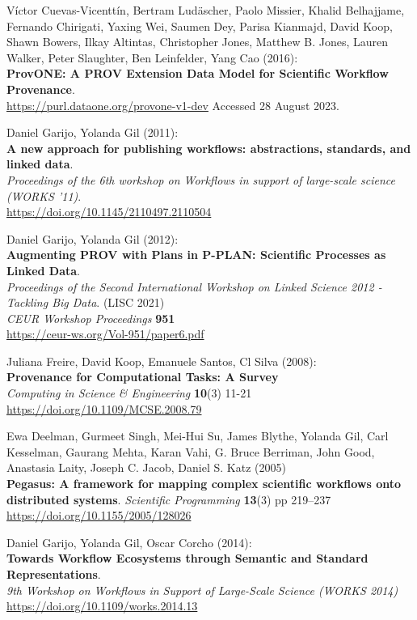 \documentclass[10pt,letterpaper]{article}
\begin{document}
\begin{thebibliography}{10}
\begin{small}
Víctor Cuevas-Vicenttín, Bertram Ludäscher, Paolo Missier, Khalid Belhajjame, Fernando Chirigati, Yaxing Wei, Saumen Dey, Parisa Kianmajd, David Koop, Shawn Bowers, Ilkay Altintas, Christopher Jones, Matthew B. Jones, Lauren Walker, Peter Slaughter, Ben Leinfelder, Yang Cao (2016):\\
\textbf{ProvONE: A PROV Extension Data Model for Scientific Workflow Provenance}.\\
\url{https://purl.dataone.org/provone-v1-dev}
Accessed 28 August 2023.

Daniel Garijo, Yolanda Gil (2011):\\
\textbf{A new approach for publishing workflows: abstractions, standards, and linked data}.\\
\emph{Proceedings of the 6th workshop on Workflows in support of large-scale science (WORKS '11)}.\\
\url{https://doi.org/10.1145/2110497.2110504}

Daniel Garijo, Yolanda Gil (2012):\\
\textbf{Augmenting PROV with Plans in P-PLAN: Scientific Processes as Linked Data}.\\
\emph{Proceedings of the Second International Workshop on Linked Science 2012 - Tackling Big Data}. (LISC 2021)\\
\emph{CEUR Workshop Proceedings} \textbf{951}\\
\url{https://ceur-ws.org/Vol-951/paper6.pdf}

Juliana Freire, David Koop, Emanuele Santos, Cl Silva (2008):\\
\textbf{Provenance for Computational Tasks: A Survey}\\
\emph{Computing in Science \& Engineering} \textbf{10}(3) 11-21\\
\url{https://doi.org/10.1109/MCSE.2008.79}

Ewa Deelman, Gurmeet Singh, Mei-Hui Su, James Blythe, Yolanda Gil, Carl Kesselman, Gaurang Mehta, Karan Vahi, G. Bruce Berriman, John Good, Anastasia Laity, Joseph C. Jacob, Daniel S. Katz (2005)\\
\textbf{Pegasus: A framework for mapping complex scientific workflows onto distributed systems}.
\emph{Scientific Programming} \textbf{13}(3) pp 219--237\\
\url{https://doi.org/10.1155/2005/128026}

Daniel Garijo, Yolanda Gil, Oscar Corcho (2014):\\
\textbf{Towards Workflow Ecosystems through Semantic and Standard Representations}.\\
\emph{9th Workshop on Workflows in Support of Large-Scale Science (WORKS 2014)}\\
\url{https://doi.org/10.1109/works.2014.13} 


\end{small}
\end{thebibliography}
\end{document}
